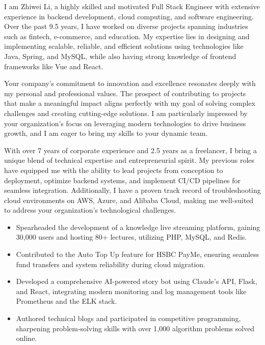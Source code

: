 \documentclass[11pt, a4paper]{./latex/awesome-cv}
\begin{document}
\makecvheader[C]


\makelettertitle

\begin{cvletter}

I am Zhiwei Li, a highly skilled and motivated Full Stack Engineer with extensive experience in backend development, cloud computing, and software engineering. Over the past 9.5 years, I have worked on diverse projects spanning industries such as fintech, e-commerce, and education. My expertise lies in designing and implementing scalable, reliable, and efficient solutions using technologies like Java, Spring, and MySQL, while also having strong knowledge of frontend frameworks like Vue and React.

Your company’s commitment to innovation and excellence resonates deeply with my personal and professional values. The prospect of contributing to projects that make a meaningful impact aligns perfectly with my goal of solving complex challenges and creating cutting-edge solutions. I am particularly impressed by your organization’s focus on leveraging modern technologies to drive business growth, and I am eager to bring my skills to your dynamic team.

With over 7 years of corporate experience and 2.5 years as a freelancer, I bring a unique blend of technical expertise and entrepreneurial spirit. My previous roles have equipped me with the ability to lead projects from conception to deployment, optimize backend systems, and implement CI/CD pipelines for seamless integration. Additionally, I have a proven track record of troubleshooting cloud environments on AWS, Azure, and Alibaba Cloud, making me well-suited to address your organization's technological challenges.

\begin{itemize}
  \item Spearheaded the development of a knowledge live streaming platform, gaining 30,000 users and hosting 80+ lectures, utilizing PHP, MySQL, and Redis.
  \item Contributed to the Auto Top Up feature for HSBC PayMe, ensuring seamless fund transfers and system reliability during cloud migration.
  \item Developed a comprehensive AI-powered story bot using Claude’s API, Flask, and React, integrating modern monitoring and log management tools like Prometheus and the ELK stack.
  \item Authored technical blogs and participated in competitive programming, sharpening problem-solving skills with over 1,000 algorithm problems solved online.
\end{itemize}


\end{cvletter}
\end{document}
